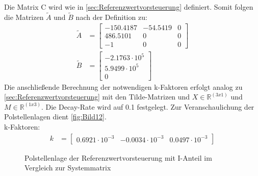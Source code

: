 \newline
Die Matrix C wird wie in \autoref{sec:Referenzwertvorsteuerung} definiert. Somit folgen die Matrizen $\tilde{A}$ und $\tilde{B}$ nach der Definition zu:
\begin{align*}
    \tilde{A} &=
    \begin{bmatrix}
        -150.4187 & -54.5419 & 0 \\
        486.5101 & 0 & 0 \\
        -1 & 0 & 0
    \end{bmatrix} \\
    \tilde{B} &=
    \begin{bmatrix}
        -2.1763\cdot 10^5 \\
        5.9499\cdot 10^5 \\
        0
    \end{bmatrix}
\end{align*}
\newline
Die anschließende Berechnung der notwendigen k-Faktoren erfolgt analog zu \autoref{sec:Referenzwertvorsteuerung} mit den Tilde-Matrizen und $X\in\mathbb{R}^{(3x1)}$ und $M\in\mathbb{R}^{(1x3)}$. Die Decay-Rate wird auf 0.1 festgelegt. Zur Veranschaulichung der Polstellenlagen dient \autoref{fig:Bild12}.\\
\newline
k-Faktoren:
\begin{align}
    k &=
    \begin{bmatrix}
        0.6921\cdot 10^{-3} & -0.0034\cdot 10^{-3} & 0.0497\cdot 10^{-3}
    \end{bmatrix}
    \label{eq:Gleichung29}
\end{align}

\begin{figure}[H]
   \centering
   \caption[Polstellenlage der Referenzwertvorsteuerung mit I-Anteil]{Polstellenlage der Referenzwertvorsteuerung mit I-Anteil im Vergleich zur Systemmatrix}
   \label{fig:Bild12}
\end{figure}

